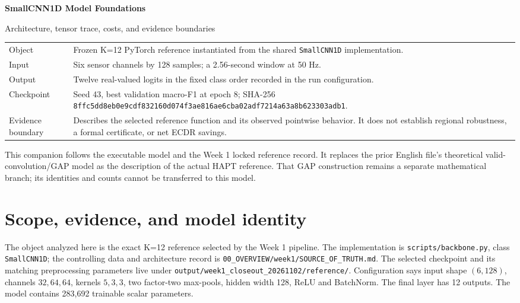 \documentclass[11pt,a4paper]{article}
\newcommand{\code}[1]{{\small\ttfamily\nolinkurl{#1}}}
\begin{document}
\begin{titlepage}
\vspace{.5cm}
{\huge\bfseries\color{ink}SmallCNN1D Model Foundations\par}\vspace{.35cm}
{\Large Architecture, tensor trace, costs, and evidence boundaries\par}\vspace{1cm}
\begin{tabularx}{\linewidth}{@{}P{3.2cm}Y@{}}\toprule
Object & Frozen K=12 PyTorch reference instantiated from the shared \code{SmallCNN1D} implementation.\\
Input & Six sensor channels by 128 samples; a 2.56-second window at 50 Hz.\\
Output & Twelve real-valued logits in the fixed class order recorded in the run configuration.\\
Checkpoint & Seed 43, best validation macro-F1 at epoch 8; SHA-256 \code{8ffc5dd8eb0e9cdf832160d074f3ae816ae6cba02adf7214a63a8b623303adb1}.\\
Evidence boundary & Describes the selected reference function and its observed pointwise behavior. It does not establish regional robustness, a formal certificate, or net ECDR savings.\\
\bottomrule\end{tabularx}
\vfill
This companion follows the executable model and the Week 1 locked reference record. It replaces the prior English file's theoretical valid-convolution/GAP model as the description of the actual HAPT reference. That GAP construction remains a separate mathematical branch; its identities and counts cannot be transferred to this model.
\end{titlepage}
\tableofcontents\clearpage

\section{Scope, evidence, and model identity}
The object analyzed here is the exact K=12 reference selected by the Week 1 pipeline. The implementation is \code{scripts/backbone.py}, class \code{SmallCNN1D}; the controlling data and architecture record is \code{00_OVERVIEW/week1/SOURCE_OF_TRUTH.md}. The selected checkpoint and its matching preprocessing parameters live under \code{output/week1_closeout_20261102/reference/}. Configuration says input shape $(6,128)$, channels $32,64,64$, kernels $5,3,3$, two factor-two max-pools, hidden width 128, ReLU and BatchNorm. The final layer has 12 outputs. The model contains 283,692 trainable scalar parameters.
\end{document}
